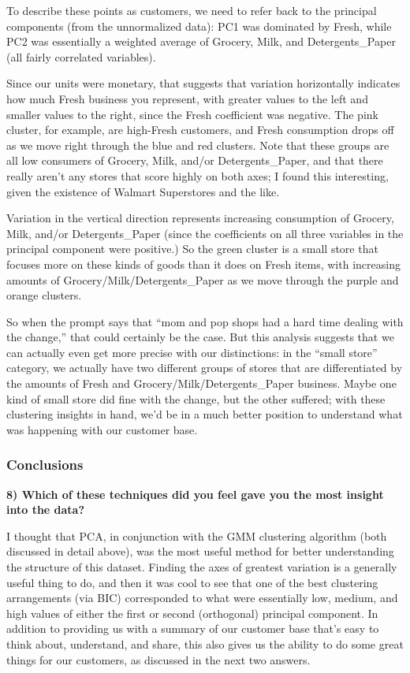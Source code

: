\documentclass{article}
\begin{document}
    To describe these points as customers, we need to refer back to the
principal components (from the unnormalized data): PC1 was dominated by
Fresh, while PC2 was essentially a weighted average of Grocery, Milk,
and Detergents\_Paper (all fairly correlated variables).

Since our units were monetary, that suggests that variation horizontally
indicates how much Fresh business you represent, with greater values to
the left and smaller values to the right, since the Fresh coefficient
was negative. The pink cluster, for example, are high-Fresh customers,
and Fresh consumption drops off as we move right through the blue and
red clusters. Note that these groups are all low consumers of Grocery,
Milk, and/or Detergents\_Paper, and that there really aren't any stores
that score highly on both axes; I found this interesting, given the
existence of Walmart Superstores and the like.

Variation in the vertical direction represents increasing consumption of
Grocery, Milk, and/or Detergents\_Paper (since the coefficients on all
three variables in the principal component were positive.) So the green
cluster is a small store that focuses more on these kinds of goods than
it does on Fresh items, with increasing amounts of
Grocery/Milk/Detergents\_Paper as we move through the purple and orange
clusters.

So when the prompt says that ``mom and pop shops had a hard time dealing
with the change,'' that could certainly be the case. But this analysis
suggests that we can actually even get more precise with our
distinctions: in the ``small store'' category, we actually have two
different groups of stores that are differentiated by the amounts of
Fresh and Grocery/Milk/Detergents\_Paper business. Maybe one kind of
small store did fine with the change, but the other suffered; with these
clustering insights in hand, we'd be in a much better position to
understand what was happening with our customer base.

    \subsubsection{Conclusions}\label{conclusions}

\textbf{8) Which of these techniques did you feel gave you the most
insight into the data?}

    I thought that PCA, in conjunction with the GMM clustering algorithm
(both discussed in detail above), was the most useful method for better
understanding the structure of this dataset. Finding the axes of
greatest variation is a generally useful thing to do, and then it was
cool to see that one of the best clustering arrangements (via BIC)
corresponded to what were essentially low, medium, and high values of
either the first or second (orthogonal) principal component. In addition
to providing us with a summary of our customer base that's easy to think
about, understand, and share, this also gives us the ability to do some
great things for our customers, as discussed in the next two answers.
\end{document}
